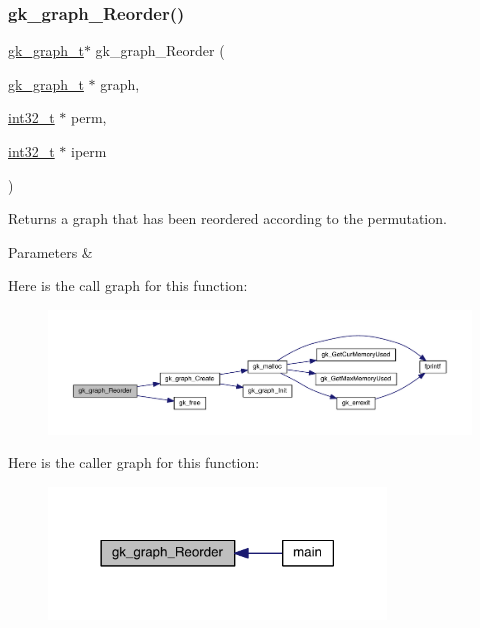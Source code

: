 \subsubsection{\texorpdfstring{gk\+\_\+graph\+\_\+\+Reorder()}{gk\_graph\_Reorder()}}
{\footnotesize\ttfamily \hyperlink{a00638}{gk\+\_\+graph\+\_\+t}$\ast$ gk\+\_\+graph\+\_\+\+Reorder (\begin{DoxyParamCaption}\item[{\hyperlink{a00638}{gk\+\_\+graph\+\_\+t} $\ast$}]{graph,  }\item[{\hyperlink{a00119_a37994e3b11c72957c6f454c6ec96d43d}{int32\+\_\+t} $\ast$}]{perm,  }\item[{\hyperlink{a00119_a37994e3b11c72957c6f454c6ec96d43d}{int32\+\_\+t} $\ast$}]{iperm }\end{DoxyParamCaption})}

Returns a graph that has been reordered according to the permutation. 
\begin{DoxyParams}{Parameters}
{\em } & \\
\hline
\end{DoxyParams}
Here is the call graph for this function\+:\nopagebreak
\begin{figure}[H]
\begin{center}
\leavevmode
\includegraphics[width=350pt]{a00077_aab929d2134ffb92863867c93a0ce1f27_cgraph}
\end{center}
\end{figure}
Here is the caller graph for this function\+:\nopagebreak
\begin{figure}[H]
\begin{center}
\leavevmode
\includegraphics[width=254pt]{a00077_aab929d2134ffb92863867c93a0ce1f27_icgraph}
\end{center}
\end{figure}
\mbox{\label{a00077_a4726366ef9bb2ef6a202d0fae0b60b3f}} 
